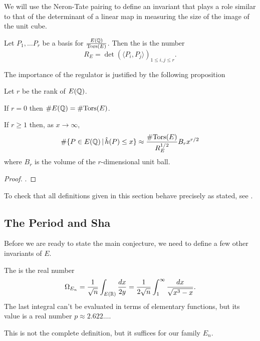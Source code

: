 \documentclass[12pt, a4paper]{amsart}
\begin{document}
We will use the Neron-Tate pairing to define an invariant that plays a role
similar to that of the determinant of a linear map in measuring the size of
the image of the unit cube.

\begin{defn}[Regulator]
  Let $P_1, \dots P_r$ be a basis for $\frac{{E({\mathbb Q})}}{{\text{\normalfont Tors}} (E)}$.
  Then the  is the number
  \[R_E = \det ( \langle P_i, P_j \rangle)_{1\leq i, j \leq r}.\]
\end{defn}

The importance of the regulator is justified by the following proposition

\begin{prop}
  Let $r$ be the rank of $E({\mathbb Q})$.

  If $r = 0$ then $\# E({\mathbb Q}) = \# {\text{\normalfont Tors}}(E)$.

  If $r \geq 1$ then, as $x \rightarrow \infty$,
  \[\# \{P \in E({\mathbb Q}) \, | \, \hat{h}(P) \leq x \} \approx \frac{\#
      {\text{\normalfont Tors}}(E)}{R_E^{1/2}}
    B_r x^{r/2}\]
  where $B_r$ is the volume of the $r$-dimensional unit ball.
\end{prop}
\begin{proof}
  \cite[See][Chapter 13.7, page 127]{Granville}.
\end{proof}
  

\begin{remark}
  To check that all definitions given in this section behave precisely as
  stated, see \cite[Chapter 13.7-8, pages 123-127]{Granville}.
\end{remark}
  

\subsection{The Period and Sha}

Before we are ready to state the main conjecture, we need to define a few
other invariants of $E$. 

\begin{defn} 
  The  is the real number
  \[ \Omega_{E_n} = \frac{1}{\sqrt{n}} \int_{E({\mathbb R})} \frac{dx}{2y} =
    \frac{1}{2 \sqrt{n}} \int_1^\infty \frac{dx}{\sqrt{x^3-x}}.\]
  The last integral can't be evaluated in terms of elementary functions,
  but its value is a real number $p \approx 2.622 \dots$.
\end{defn}
\begin{remark}
  This is not the complete definition, but it suffices for our family $E_n$.
\end{remark}
\end{document}
